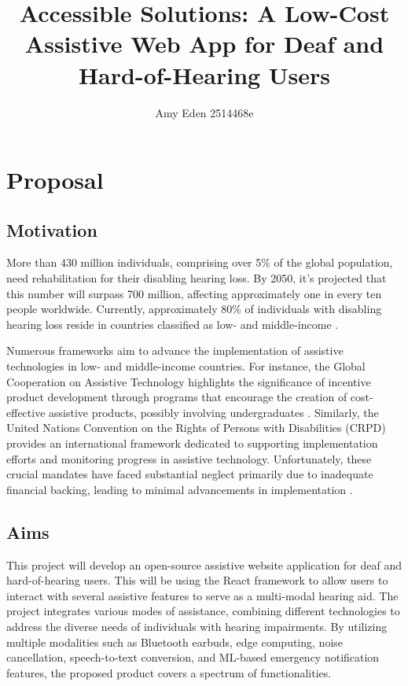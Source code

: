 \documentclass[11pt]{article}
\title{Accessible Solutions: A Low-Cost Assistive Web App for Deaf and Hard-of-Hearing Users}
\author{Amy Eden 2514468e}
\begin{document}
    \maketitle

\section{Proposal}\label{proposal}

\subsection{Motivation}\label{motivation}

More than 430 million individuals, comprising over 5\% of the global population, need rehabilitation for their disabling hearing loss. By 2050, it's projected that this number will surpass 700 million, affecting approximately one in every ten people worldwide. Currently, approximately 80\% of individuals with disabling hearing loss reside in countries classified as low- and middle-income \cite{Hapunda_2023}.

Numerous frameworks aim to advance the implementation of assistive technologies in low- and middle-income countries. For instance, the Global Cooperation on Assistive Technology highlights the significance of incentive product development through programs that encourage the creation of cost-effective assistive products, possibly involving undergraduates \cite{Tangcharoensathien2018-le}. Similarly, the United Nations Convention on the Rights of Persons with Disabilities (CRPD) \cite{United_Nations} provides an international framework dedicated to supporting implementation efforts and monitoring progress in assistive technology. Unfortunately, these crucial mandates have faced substantial neglect primarily due to inadequate financial backing, leading to minimal advancements in implementation \cite{00006479-201135010-00003}.

\subsection{Aims}\label{aims}

This project will develop an open-source assistive website application for deaf and hard-of-hearing users. This will be using the React framework to allow users to interact with several assistive features to serve as a multi-modal hearing aid. The project integrates various modes of assistance, combining different technologies to address the diverse needs of individuals with hearing impairments. By utilizing multiple modalities such as Bluetooth earbuds, edge computing, noise cancellation, speech-to-text conversion, and ML-based emergency notification features, the proposed product covers a spectrum of functionalities.
\end{document}
